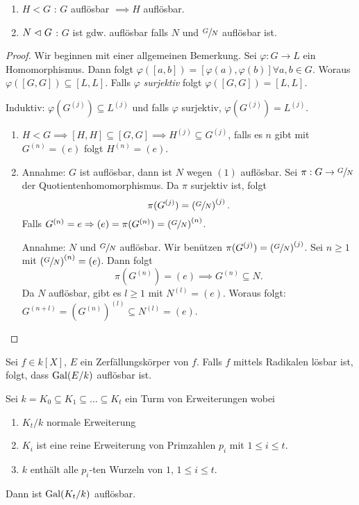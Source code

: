 \begin{proposition}
	\begin{enumerate}[(1)]
		\item $H < G$ : $G$ auflösbar $\implies H$  auflösbar.
		\item $N \vartriangleleft G$ : $G$ ist gdw. auflösbar falls $N$ und $\sfrac{G}{N}$ auflösbar ist.
	\end{enumerate}
\end{proposition}

\begin{proof}
	Wir beginnen mit einer allgemeinen Bemerkung. 
	Sei $\varphi: G \to L$ ein Homomorphismus.
	Dann folgt $\varphi([a,b]) = [\varphi(a),\varphi(b)] \forall a,b \in G$. Woraus $\varphi([G,G]) \subseteq [L,L]$.
	Falls $\varphi$ \emph{surjektiv} folgt $\varphi([G,G]) = [L,L]$.

	Induktiv: $\varphi(G^{(j)}) \subseteq L^{(j)}$ und falls $\varphi$ surjektiv, $\varphi(G^{(j)}) = L^{(j)}$.
	\begin{enumerate}[(1)]
		\item $H < G \implies [H,H] \subseteq [G,G] \implies H^{(j)} \subseteq G^{(j)}$, falls es $n$ gibt mit $G^{(n)} = (e)$ folgt $H^{(n)} = (e)$.
		\item Annahme: $G$ ist auflösbar, dann ist $N$ wegen $(1)$ auflösbar. Sei $\pi: G \to \sfrac{G}{N}$ der Quotientenhomomorphismus.
			Da $\pi$ surjektiv ist, folgt
			\[
				\pi(G^{(j)}) = \left( \sfrac{G}{N} \right)^{(j)}
			.\] 
			Falls $G^{(n)} = e \Rightarrow (e) = \pi(G^{(n)}) = \left( \sfrac{G}{N} \right)^{(n)}$.
			
			Annahme: $N$ und $\sfrac{G}{N}$ auflösbar. Wir benützen $\pi(G^{(j)}) = \left( \sfrac{G}{N} \right)^{(j)}$.
			Sei $n \geq 1$ mit $\left( \sfrac{G}{N} \right)^{(n)} = (e)$. Dann folgt
			\[
				\pi(G^{(n)}) = (e) \implies G^{(n)} \subseteq N
			.\] 
			Da $N$ auflösbar, gibt es $l \geq 1$ mit $N^{(l)} = (e)$. Woraus folgt: $G^{(n+l)} = \left( G^{(n)} \right)^{(l)} \subseteq N^{(l)} = (e)$.
	\end{enumerate}
\end{proof}

\begin{theorem}
	Sei $f \in k[X]$, $E$ ein Zerfällungskörper von $f$. Falls $f$ mittels Radikalen lösbar ist, folgt, dass $\operatorname{Gal}(E / k)$ auflösbar ist.
\end{theorem}

\begin{lemma}
	Sei $k = K_0 \subseteq K_1 \subseteq \ldots \subseteq K_{t}$ ein Turm von Erweiterungen wobei
	\begin{enumerate}[(1)]
		\item $K_{t} / k$ normale Erweiterung
		\item $K_{i}$ ist eine reine Erweiterung von Primzahlen $p_{i}$ mit $1 \leq i \leq t$.
		\item $k$ enthält alle $p_{i}$-ten Wurzeln von $1$, $1 \leq i \leq t$.
	\end{enumerate}
	Dann ist $\operatorname{Gal}(K_{t} / k)$ auflösbar.
\end{lemma}

